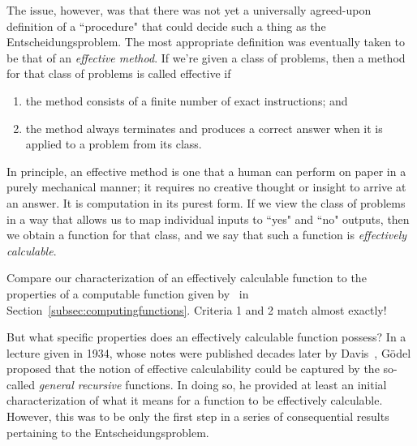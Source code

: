 The issue, however, was that there was not yet a universally agreed-upon definition of a ``procedure" that could decide such a thing as the Entscheidungsproblem. The most appropriate definition was eventually taken to be that of an \emph{effective method}. If we're given a class of problems, then a method for that class of problems is called effective if
\begin{colouredbox}
\begin{enumerate}
\item the method consists of a finite number of exact instructions; and
\item the method always terminates and produces a correct answer when it is applied to a problem from its class.
\end{enumerate}
\end{colouredbox}
In principle, an effective method is one that a human can perform on paper in a purely mechanical manner; it requires no creative thought or insight to arrive at an answer. It is computation in its purest form. If we view the class of problems in a way that allows us to map individual inputs to ``yes" and ``no" outputs, then we obtain a function for that class, and we say that such a function is \emph{effectively calculable}.

\begin{remark}
Compare our characterization of an effectively calculable function to the properties of a computable function given by~\citet{Enderton1977ElementsRecursionTheory} in Section~\ref{subsec:computingfunctions}. Criteria 1 and 2 match almost exactly!
\end{remark}

But what specific properties does an effectively calculable function possess? In a lecture given in 1934, whose notes were published decades later by Davis~\citeyearpar{Godel1934UndecidablePropositions}, G\"{o}del proposed that the notion of effective calculability could be captured by the so-called \emph{general recursive} functions. In doing so, he provided at least an initial characterization of what it means for a function to be effectively calculable. However, this was to be only the first step in a series of consequential results pertaining to the Entscheidungsproblem.


